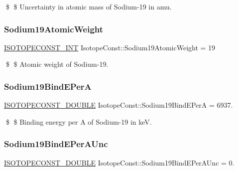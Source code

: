 \$ \$ Uncertainty in atomic mass of Sodium-\/19 in amu. \mbox{\label{group___isotope_const-_sodium-_na19_gaab3f282a367298561b628921492a3249}} 
\subsubsection{\texorpdfstring{Sodium19\+Atomic\+Weight}{Sodium19AtomicWeight}}
{\footnotesize\ttfamily \mbox{\hyperlink{group___isotope_const-_macros_ga5f18360b3e99483a35c32d789e62621c}{I\+S\+O\+T\+O\+P\+E\+C\+O\+N\+S\+T\+\_\+\+I\+NT}} Isotope\+Const\+::\+Sodium19\+Atomic\+Weight = 19}

\$ \$ Atomic weight of Sodium-\/19. \mbox{\label{group___isotope_const-_sodium-_na19_ga8011a4b379cf7c9a0d7f751cc2c0260c}} 
\subsubsection{\texorpdfstring{Sodium19\+Bind\+E\+PerA}{Sodium19BindEPerA}}
{\footnotesize\ttfamily \mbox{\hyperlink{group___isotope_const-_macros_ga8f45a7272ce02c0b4c65c44636ed719a}{I\+S\+O\+T\+O\+P\+E\+C\+O\+N\+S\+T\+\_\+\+D\+O\+U\+B\+LE}} Isotope\+Const\+::\+Sodium19\+Bind\+E\+PerA = 6937.}

\$ \$ Binding energy per A of Sodium-\/19 in keV. \mbox{\label{group___isotope_const-_sodium-_na19_ga283f712d5b536fcf00a762138b27286b}} 
\subsubsection{\texorpdfstring{Sodium19\+Bind\+E\+Per\+A\+Unc}{Sodium19BindEPerAUnc}}
{\footnotesize\ttfamily \mbox{\hyperlink{group___isotope_const-_macros_ga8f45a7272ce02c0b4c65c44636ed719a}{I\+S\+O\+T\+O\+P\+E\+C\+O\+N\+S\+T\+\_\+\+D\+O\+U\+B\+LE}} Isotope\+Const\+::\+Sodium19\+Bind\+E\+Per\+A\+Unc = 0.}

